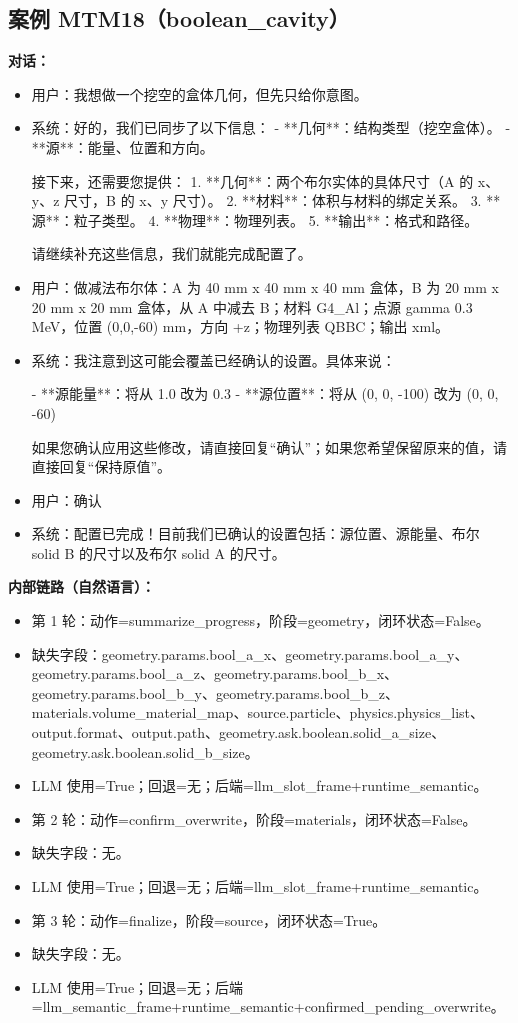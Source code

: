 \documentclass[11pt]{ctexart}
\begin{document}
\subsection{案例 MTM18（boolean\_cavity）}
\textbf{对话：}
\begin{itemize}
\item 用户：我想做一个挖空的盒体几何，但先只给你意图。
\item 系统：好的，我们已同步了以下信息：
- **几何**：结构类型（挖空盒体）。
- **源**：能量、位置和方向。

接下来，还需要您提供：
1.  **几何**：两个布尔实体的具体尺寸（A 的 x、y、z 尺寸，B 的 x、y 尺寸）。
2.  **材料**：体积与材料的绑定关系。
3.  **源**：粒子类型。
4.  **物理**：物理列表。
5.  **输出**：格式和路径。

请继续补充这些信息，我们就能完成配置了。
\item 用户：做减法布尔体：A 为 40 mm x 40 mm x 40 mm 盒体，B 为 20 mm x 20 mm x 20 mm 盒体，从 A 中减去 B；材料 G4\_Al；点源 gamma 0.3 MeV，位置 (0,0,-60) mm，方向 +z；物理列表 QBBC；输出 xml。
\item 系统：我注意到这可能会覆盖已经确认的设置。具体来说：

- **源能量**：将从 1.0 改为 0.3
- **源位置**：将从 (0, 0, -100) 改为 (0, 0, -60)

如果您确认应用这些修改，请直接回复“确认”；如果您希望保留原来的值，请直接回复“保持原值”。
\item 用户：确认
\item 系统：配置已完成！目前我们已确认的设置包括：源位置、源能量、布尔 solid B 的尺寸以及布尔 solid A 的尺寸。
\end{itemize}
\textbf{内部链路（自然语言）：}
\begin{itemize}
\item 第 1 轮：动作=summarize\_progress，阶段=geometry，闭环状态=False。
\item 缺失字段：geometry.params.bool\_a\_x、geometry.params.bool\_a\_y、geometry.params.bool\_a\_z、geometry.params.bool\_b\_x、geometry.params.bool\_b\_y、geometry.params.bool\_b\_z、materials.volume\_material\_map、source.particle、physics.physics\_list、output.format、output.path、geometry.ask.boolean.solid\_a\_size、geometry.ask.boolean.solid\_b\_size。
\item LLM 使用=True；回退=无；后端=llm\_slot\_frame+runtime\_semantic。
\item 第 2 轮：动作=confirm\_overwrite，阶段=materials，闭环状态=False。
\item 缺失字段：无。
\item LLM 使用=True；回退=无；后端=llm\_slot\_frame+runtime\_semantic。
\item 第 3 轮：动作=finalize，阶段=source，闭环状态=True。
\item 缺失字段：无。
\item LLM 使用=True；回退=无；后端=llm\_semantic\_frame+runtime\_semantic+confirmed\_pending\_overwrite。
\end{itemize}
\end{document}
